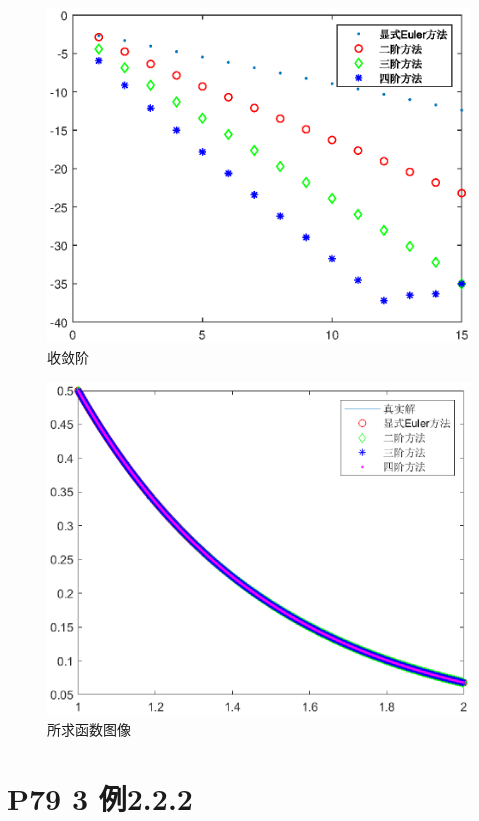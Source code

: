 \documentclass{article}%
\begin{document}
\begin{figure}
	\includegraphics[width=1\linewidth]{week4_5_1.eps}
	\caption{收敛阶}  
	\label{Fig:3}
\end{figure}

\begin{figure}
	\includegraphics[width=1\linewidth]{week4_5_2.eps}
	\caption{所求函数图像}  
	\label{Fig:4}
\end{figure}

\section{P79 3 例2.2.2}
\end{document}
